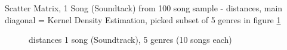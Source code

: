 \noindent Scatter Matrix, 1 Song (Soundtack) from 100 song sample - distances, main diagonal = Kernel Density Estimation, picked subset of 5 genres in figure \ref{fig:corr8}
\begin{figure}[htbp]
	\centering
	\caption{distances 1 song (Soundtrack), 5 genres (10 songs each)}
	\label{fig:corr8}
\end{figure}

